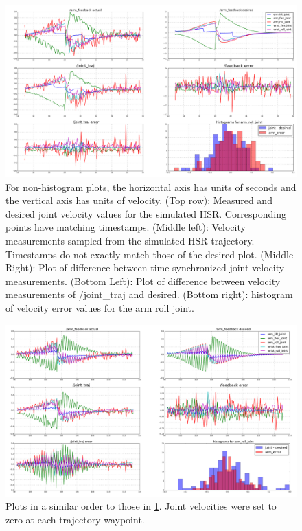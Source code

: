 \documentclass[11pt]{article}
\begin{document}
        \begin{figure}
            \includegraphics[width=\linewidth]{2020.04.03/t8/figure_1_first_100_points_20_bins_trial6_fixed.png}
            \centering
            \caption{For non-histogram plots, the horizontal axis has units of seconds and the vertical axis has units of velocity. (Top row): Measured and desired joint velocity values for the simulated HSR. Corresponding points have matching timestamps. (Middle left): Velocity measurements sampled from the simulated HSR trajectory. Timestamps do not exactly match those of the desired plot. (Middle Right): Plot of difference between time-synchronized joint velocity measurements. (Bottom Left): Plot of difference between velocity measurements of /joint\_traj and desired. (Bottom right): histogram of velocity error values for the arm roll joint.}
            \label{fig:velocityAccuracy}
        \end{figure}
        \begin{figure}[ht]
            \includegraphics[width=\linewidth]{2020.04.07/arm_vel_goals_set_to_zero_fixed.png}
            \centering
            \caption{Plots in a similar order to those in \cref{fig:velocityAccuracy}. Joint velocities were set to zero at each trajectory waypoint.}
            \label{fig:velocityZero}
        \end{figure}
\end{document}
